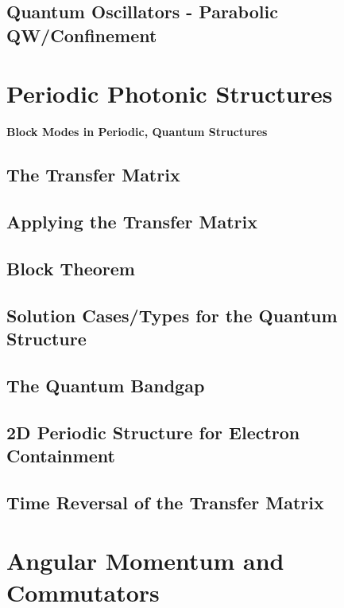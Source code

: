 \documentclass[colorlinks,11pt,a4paper,normalphoto,withhyper,ragged2e]{altareport}
\renewcommand{\ReportSectionFont}{\LARGE\rmfamily\bfseries} %
\begin{document}
		
	\subsection{Quantum Oscillators - Parabolic QW/Confinement}
	
	
	\pagebreak
	
	
	
	
\section{Periodic Photonic Structures}\vskip0pt
	{\quad\quad\color{heading}\ReportSectionFont{Block Modes in Periodic, Quantum Structures}}
		
	\subsection{The Transfer Matrix}
	
	
	\subsection{Applying the Transfer Matrix}
	
	
	\subsection{Block Theorem}
	
	
	\subsection{Solution Cases/Types for the Quantum Structure}
	
	
	\subsection{The Quantum Bandgap}
	
	
	\subsection{2D Periodic Structure for Electron Containment}
	
	
	\subsection{Time Reversal of the Transfer Matrix}
	
	
	\pagebreak
	
	
	
	
\section{Angular Momentum and Commutators}
	
\end{document}
